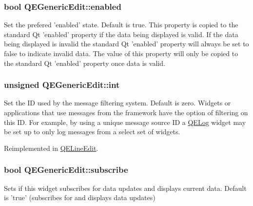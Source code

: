 \hypertarget{classQEGenericEdit_a7f543d99ef8b0b0ab2550b9e9f6cbbce}{
\subsubsection[{enabled}]{\setlength{\rightskip}{0pt plus 5cm}bool QEGenericEdit::enabled}}
\label{classQEGenericEdit_a7f543d99ef8b0b0ab2550b9e9f6cbbce}
Set the prefered 'enabled' state. Default is true. This property is copied to the standard Qt 'enabled' property if the data being displayed is valid. If the data being displayed is invalid the standard Qt 'enabled' property will always be set to false to indicate invalid data. The value of this property will only be copied to the standard Qt 'enabled' property once data is valid. \hypertarget{classQEGenericEdit_a9e520be7f9bbbede4efc7fb4c9cebd9d}{
\subsubsection[{int}]{\setlength{\rightskip}{0pt plus 5cm}unsigned QEGenericEdit::int}}
\label{classQEGenericEdit_a9e520be7f9bbbede4efc7fb4c9cebd9d}
Set the ID used by the message filtering system. Default is zero. Widgets or applications that use messages from the framework have the option of filtering on this ID. For example, by using a unique message source ID a \hyperlink{classQELog}{QELog} widget may be set up to only log messages from a select set of widgets. 

Reimplemented in \hyperlink{classQELineEdit_adf8beec6661bba8c6a8a277c0dcd2bdd}{QELineEdit}.

\hypertarget{classQEGenericEdit_a3cb8e9d1d34565e89d1c484504975fb5}{
\subsubsection[{subscribe}]{\setlength{\rightskip}{0pt plus 5cm}bool QEGenericEdit::subscribe}}
\label{classQEGenericEdit_a3cb8e9d1d34565e89d1c484504975fb5}
Sets if this widget subscribes for data updates and displays current data. Default is 'true' (subscribes for and displays data updates) 

